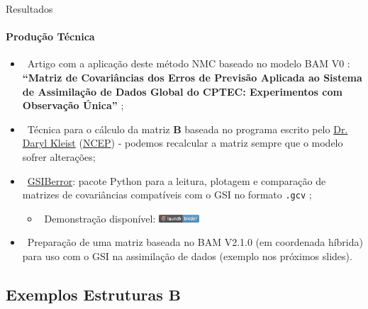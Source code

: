 \documentclass[10pt,aspectratio=169]{beamer}
\begin{document}
\begin{frame}{Resultados}
\framesubtitle{Produção Técnica~\faCogs}
  \begin{itemize}
    \item {}~Artigo com a aplicação deste método NMC baseado no modelo BAM V0 \cite{figueroaetal/2016}: \textbf{``Matriz de Covariâncias dos Erros de Previsão Aplicada ao Sistema de Assimilação de Dados Global do CPTEC: Experimentos com Observação Única''} \cite{bastarz/2017};
    \pause
    \item \faCode~Técnica para o cálculo da matriz $\mathbf{B}$ baseada no programa escrito pelo \href{https://community.wmo.int/contacts/dr-daryl-t-kleist}{Dr. Daryl Kleist} (\href{https://www.weather.gov/ncep/}{NCEP}) - podemos recalcular a matriz sempre que o modelo sofrer alterações;
    \pause
    \item \faCode~\href{https://github.com/GAD-DIMNT-CPTEC/GSIBerror}{GSIBerror}: pacote Python para a leitura, plotagem e comparação de matrizes de covariâncias compatíveis com o GSI no formato \texttt{.gcv} \cite{bastarz/2022};
    \pause
    \begin{itemize}
    	\item \faPython~Demonstração disponível: \href{https://mybinder.org/v2/gh/cfbastarz/GSIBerror/main}{\includegraphics[width=1.5cm]{binder.png}}
    \end{itemize}
    \pause
    \item \faFlask~Preparação de uma matriz baseada no BAM V2.1.0 (em coordenada híbrida) para uso com o GSI na assimilação de dados (exemplo nos próximos slides).
  \end{itemize}
\end{frame}

\subsection{Exemplos Estruturas $\mathbf{B}$}
\end{document}
